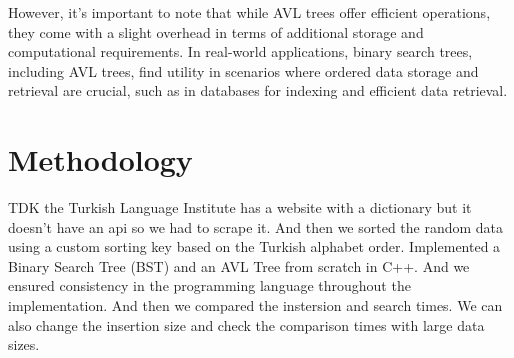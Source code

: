 \documentclass{article}
\begin{document}
However, it's important to note that while AVL trees offer efficient operations, they come with a slight overhead in terms of additional storage and computational requirements. In real-world applications, binary search trees, including AVL trees, find utility in scenarios where ordered data storage and retrieval are crucial, such as in databases for indexing and efficient data retrieval.

\maketitle
\section{Methodology}
TDK the Turkish Language Institute has a website with a dictionary but it doesn't have an api so we had to scrape it. And then we sorted the random data using a custom sorting key based on the Turkish alphabet order. 
Implemented a Binary Search Tree (BST) and an AVL Tree from scratch in C++. And we ensured consistency in the programming language throughout the implementation. And then we compared the instersion and search times.
We can also change the insertion size and check the comparison times with large data sizes.


\maketitle
\end{document}
